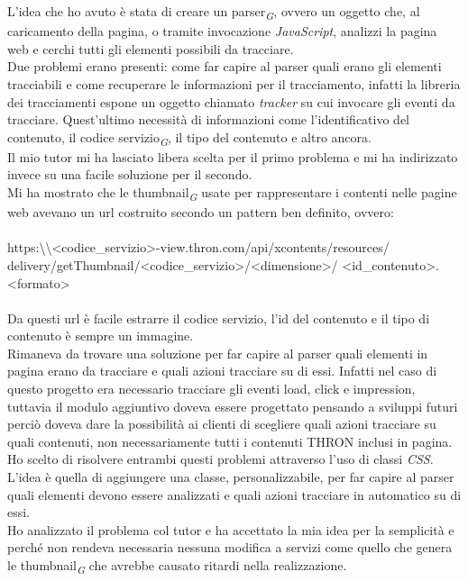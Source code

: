 \documentclass[a4paper, 12pt, twoside, openright]{book}
\newcommand{\gloss}[1]{#1\textsubscript{\textit{\tiny{G}}}}
\begin{document}
L'idea che ho avuto è stata di creare un \gloss{parser}, ovvero un oggetto che, al caricamento della pagina, o tramite invocazione \textit{JavaScript}, analizzi la pagina web e cerchi tutti gli elementi possibili da tracciare.\\
Due problemi erano presenti: come far capire al parser quali erano gli elementi tracciabili e come recuperare le informazioni per il tracciamento, infatti la libreria dei tracciamenti espone un oggetto chiamato \textit{tracker} su cui invocare gli eventi da tracciare. Quest'ultimo necessità di informazioni come l'identificativo del contenuto, il \gloss{codice servizio}, il tipo del contenuto e altro ancora.\\
Il mio tutor mi ha lasciato libera scelta per il primo problema e mi ha indirizzato invece su una facile soluzione per il secondo.\\
Mi ha mostrato che le \gloss{thumbnail} usate per rappresentare i contenti nelle pagine web avevano un url costruito secondo un pattern ben definito, ovvero:\\ \\
{\fontsize{10}{12}\selectfont https:\textbackslash\textbackslash<codice\_servizio>-view.thron.com/api/xcontents/resources/
delivery/getThumbnail/<codice\_servizio>/<dimensione>/
<id\_contenuto>.<formato>} %
\\ \\
Da questi url è facile estrarre il codice servizio, l'id del contenuto e il tipo di contenuto è sempre un immagine.\\
Rimaneva da trovare una soluzione per far capire al parser quali elementi in pagina erano da tracciare e quali azioni tracciare su di essi. Infatti nel caso di questo progetto era necessario tracciare gli eventi load, click e impression, tuttavia il modulo aggiuntivo doveva essere progettato pensando a sviluppi futuri perciò doveva dare la possibilità ai clienti di scegliere quali azioni tracciare su quali contenuti, non necessariamente tutti i contenuti THRON inclusi in pagina.\\
Ho scelto di risolvere entrambi questi problemi attraverso l'uso di classi \textit{CSS}. L'idea è quella di aggiungere una classe, personalizzabile, per far capire al parser quali elementi devono essere analizzati e quali azioni tracciare in automatico su di essi.\\
Ho analizzato il problema col tutor e ha accettato la mia idea per la semplicità e perché non rendeva necessaria nessuna modifica a servizi come quello che genera le \gloss{thumbnail} che avrebbe causato ritardi nella realizzazione.\\
\end{document}
